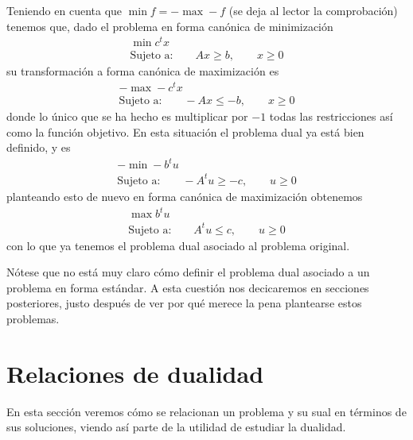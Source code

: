 \begin{exa}[Minimización]
	Teniendo en cuenta que $\min f = -\max -f$ (se deja al lector la comprobación) tenemos que, dado el problema en forma canónica de minimización
	\begin{equation*}
		\begin{array}{c}
			\min c^tx\\
			\text{Sujeto a:}\qquad Ax\geq b,\qquad x\geq 0
		\end{array}
	\end{equation*}
	su transformación a forma canónica de maximización es
	\begin{equation*}
		\begin{array}{c}
			-\max -c^tx\\
			\text{Sujeto a:}\qquad -Ax\leq -b,\qquad x\geq 0
		\end{array}
	\end{equation*}
	donde lo único que se ha hecho es multiplicar por $-1$ todas las restricciones así como la función objetivo. En esta situación el problema dual ya está bien definido, y es
	\begin{equation*}
		\begin{array}{c}
			-\min -b^tu\\
			\text{Sujeto a:}\qquad -A^tu\geq -c,\qquad u\geq 0
		\end{array}
	\end{equation*}
	planteando esto de nuevo en forma canónica de maximización obtenemos
	\begin{equation*}
		\begin{array}{c}
			\max b^tu\\
			\text{Sujeto a:}\qquad A^tu\leq c,\qquad u\geq 0
		\end{array}
	\end{equation*}
	con lo que ya tenemos el problema dual asociado al problema original.
\end{exa}
Nótese que no está muy claro cómo definir el problema dual asociado a un problema en forma estándar. A esta cuestión nos decicaremos en secciones posteriores, justo después de ver por qué merece la pena plantearse estos problemas.
\section{Relaciones de dualidad}
En esta sección veremos cómo se relacionan un problema y su sual en términos de sus soluciones, viendo así parte de la utilidad de estudiar la dualidad.